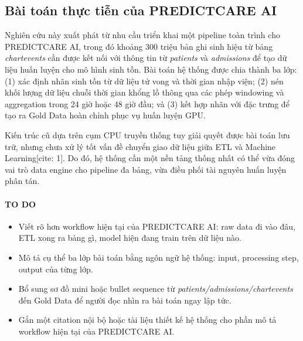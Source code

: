 \subsection{Bài toán thực tiễn của PREDICTCARE AI}
Nghiên cứu này xuất phát từ nhu cầu triển khai một pipeline toàn trình cho PREDICTCARE AI, trong đó khoảng 300 triệu bản ghi sinh hiệu từ bảng \textit{chartevents} cần được kết nối với thông tin từ \textit{patients} và \textit{admissions} để tạo dữ liệu huấn luyện cho mô hình sinh tồn. Bài toán hệ thống được chia thành ba lớp: (1) xác định nhãn sinh tồn từ dữ liệu tử vong và thời gian nhập viện; (2) nén khối lượng dữ liệu chuỗi thời gian khổng lồ thông qua các phép windowing và aggregation trong 24 giờ hoặc 48 giờ đầu; và (3) kết hợp nhãn với đặc trưng để tạo ra Gold Data hoàn chỉnh phục vụ huấn luyện GPU.

Kiến trúc cũ dựa trên cụm CPU truyền thống tuy giải quyết được bài toán lưu trữ, nhưng chưa xử lý tốt vấn đề chuyển giao dữ liệu giữa ETL và Machine Learning[cite: 1]. Do đó, hệ thống cần một nền tảng thống nhất có thể vừa đóng vai trò data engine cho pipeline đa bảng, vừa điều phối tài nguyên huấn luyện phân tán.

\paragraph{TO DO}
\begin{itemize}
    \item Viết rõ hơn workflow hiện tại của PREDICTCARE AI: raw data đi vào đâu, ETL xong ra bảng gì, model hiện đang train trên dữ liệu nào.
    \item Mô tả cụ thể ba lớp bài toán bằng ngôn ngữ hệ thống: input, processing step, output của từng lớp.
    \item Bổ sung sơ đồ mini hoặc bullet sequence từ \textit{patients/admissions/chartevents} đến Gold Data để người đọc nhìn ra bài toán ngay lập tức.
    \item Gắn một citation nội bộ hoặc tài liệu thiết kế hệ thống cho phần mô tả workflow hiện tại của PREDICTCARE AI.
\end{itemize}

